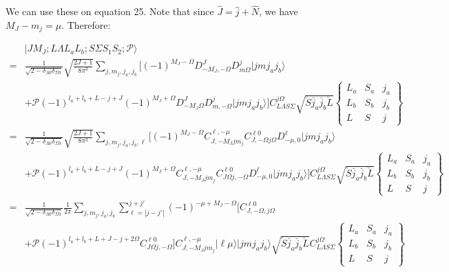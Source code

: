 \documentclass[prl, longbibliography, aps, 10pt]{revtex4-2}
\begin{document}
We can use these on equation 25. Note that since $\hat{J}=\hat{j}+\hat{N}$, we have $M_J-m_j=\mu$. Therefore:

\begin{equation}
\begin{split}
&|J M_J; L \Lambda L_a L_b; S \Sigma  S_1 S_2; \mathcal{P} \rangle
\\
=&\frac{1}{\sqrt{2-\delta_{\Lambda 0}\delta_{\Sigma 0}}}
\sqrt{\frac{2J+1}{8\pi^3}}
\sum_{j, m_j, j_a, j_b} \bigg[
(-1)^{M_J-\Omega} D_{-M_J,-\Omega}^J
D^j_{m \Omega}
|j m j_a j_b\rangle
\\
&+
\mathcal{P}(-1)^{l_a+l_b+L-j+J}
(-1)^{M_J+\Omega} D_{-M_J\Omega}^J
D^j_{m,-\Omega}|j m j_a j_b\rangle \bigg]
C_{L\Lambda S\Sigma}^{j\Omega}\sqrt{\breve{S}\breve{j_a}\breve{j_b}\breve{L}}
\begin{Bmatrix}
L_a & S_a & j_a\\
L_b & S_b & j_b\\
L & S & j
\end{Bmatrix}
\\
=&\frac{1}{\sqrt{2-\delta_{\Lambda 0}\delta_{\Sigma 0}}}
\sqrt{\frac{2J+1}{8\pi^3}}
\sum_{j, m_j, j_a, j_b,\ell} \bigg[
(-1)^{M_J-\Omega} 
C_{J,-M_J j m_j}^{\ell, -\mu}
C_{J,-\Omega j \Omega}^{\ell 0}
D^{\ell}_{-\mu,0}
|j m j_a j_b\rangle
\\
&+
\mathcal{P}(-1)^{l_a+l_b+L-j+J}
(-1)^{M_J+\Omega} 
C_{J,-M_J j m_j}^{\ell, -\mu}
C_{J\Omega j,-\Omega}^{\ell 0}
D^{\ell}_{-\mu,0}
|j m j_a j_b\rangle \bigg]
C_{L\Lambda S\Sigma}^{j\Omega}\sqrt{\breve{S}\breve{j_a}\breve{j_b}\breve{L}}
\begin{Bmatrix}
L_a & S_a & j_a\\
L_b & S_b & j_b\\
L & S & j
\end{Bmatrix}
\\
=&\frac{1}{\sqrt{2-\delta_{\Lambda 0}\delta_{\Sigma 0}}}
\frac{1}{2\pi}
\sum_{j, m_j, j_a, j_b} 
\sum_{\ell=|j-j'|}^{j+j'} 
(-1)^{-\mu+M_J-\Omega}
\bigg[
C_{J,-\Omega, j \Omega}^{\ell 0}
\\
&+\mathcal{P}(-1)^{l_a+l_b+L+J-j+2\Omega}
C_{J\Omega j,-\Omega}^{\ell 0}
\bigg]
C_{J,-M_J j m_j}^{\ell, -\mu}|\ell\mu\rangle |j m j_a j_b\rangle
\sqrt{\breve{S}\breve{j_a}\breve{j_b}\breve{L}} 
C_{L \Lambda S \Sigma}^{j \Omega}
\begin{Bmatrix}
L_a & S_a & j_a\\
L_b & S_b & j_b\\
L & S & j
\end{Bmatrix}
\end{split}
\end{equation}
\end{document}
